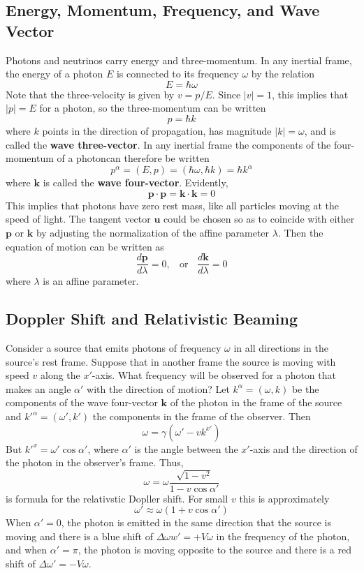 \subsection{Energy, Momentum, Frequency, and Wave Vector}

Photons and neutrinos carry energy and three-momentum. In any inertial frame, the energy of a photon $E$ is connected to its frequency $\omega$ by the relation $$E = \hbar\omega$$
Note that the three-velocity is given by $v = p/E$. Since $|v| = 1$, this implies that $|p| = E$ for a photon, so the three-momentum can be written $$p = \hbar k$$
where $k$ points in the direction of propagation, has magnitude $|k| = \omega$, and is called the \textbf{wave three-vector}. In any inertial frame the components of the four-momentum of a photoncan therefore be written $$\boxed{p^{\alpha} = (E,p) = (\hbar\omega,\hbar k) = \hbar k^{\alpha}}$$
where $\mathbf{k}$ is called the \textbf{wave four-vector}. Evidently, $$\mathbf{p}\cdot\mathbf{p} = \mathbf{k}\cdot\mathbf{k} = 0$$
This implies that photons have zero rest mass, like all particles moving at the speed of light. The tangent vector $\mathbf{u}$ could be chosen so as to coincide with either $\mathbf{p}$ or $\mathbf{k}$ by adjusting the normalization of the affine parameter $\lambda$. Then the equation of motion can be written as $$\frac{d\mathbf{p}}{d\lambda} = 0,\;\;\text{ or }\;\;\frac{d\mathbf{k}}{d\lambda} = 0$$
where $\lambda$ is an affine parameter.

\subsection{Doppler Shift and Relativistic Beaming}

Consider a source that emits photons of frequency $\omega$ in all directions in the source's rest frame. Suppose that in another frame the source is moving with speed $v$ along the $x'$-axis. What frequency will be observed for a photon that makes an angle $\alpha'$ with the direction of motion? Let $k^{\alpha} = (\omega,k)$ be the components of the wave four-vector $\mathbf{k}$ of the photon in the frame of the source and ${k'}^{\alpha} = (\omega',k')$ the components in the frame of the observer. Then $$\omega = \gamma(\omega' - vk^{x'})$$
But ${k'}^x = \omega'\cos\alpha'$, where $\alpha'$ is the angle between the $x'$-axis and the direction of the photon in the observer's frame. Thus, \begin{equation*}
    \boxed{\omega = \omega\frac{\sqrt{1-v^2}}{1-v\cos\alpha'}}
\end{equation*}
is formula for the relativstic Dopller shift. For small $v$ this is approximately $$\omega' \approx \omega(1+v\cos\alpha')$$ When $\alpha' = 0$, the photon is emitted in the same direction that the source is moving and there is a blue shift of $\Delta \omega w' = +V\omega$ in the frequency of the photon, and when $\alpha' = \pi$, the photon is moving opposite to the source and there is a red shift of $\Delta \omega' = -V\omega$.

